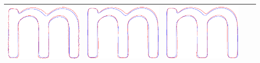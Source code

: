 \documentclass[12pt]{article}
\begin{document}
\begin{center}
\begin{tabular}{|c|c|c|c|c|}
\includegraphics[scale = 0.2]{images/f2var1} &
\includegraphics[scale = 0.2]{images/f2var0_1} &
\includegraphics[scale = 0.2]{images/f2var0_01} \\ \hline

\end{tabular}
\end{center}
\end{document}
